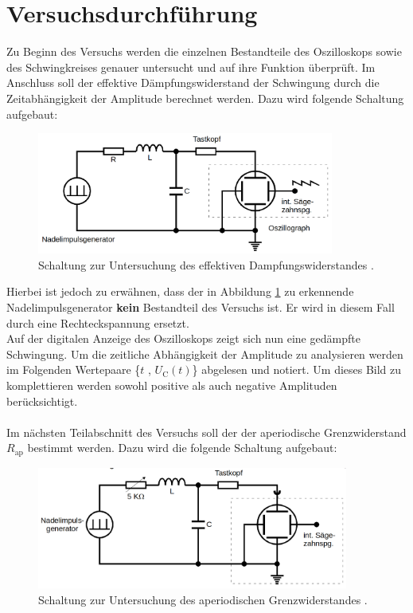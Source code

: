 


\section{Versuchsdurchführung}

Zu Beginn des Versuchs werden die einzelnen Bestandteile des Oszilloskops sowie des Schwingkreises genauer untersucht 
und auf ihre Funktion überprüft. Im Anschluss soll der effektive Dämpfungswiderstand der Schwingung durch die 
Zeitabhängigkeit der Amplitude berechnet werden. Dazu wird folgende Schaltung aufgebaut:

\begin{figure}
    \centering
    \includegraphics[height=4cm]{5a.png}
    \caption{Schaltung zur Untersuchung des effektiven Dampfungswiderstandes \cite{Versuchsanleitung_v354}.}
    \label{fig:5a}
\end{figure}

\noindent Hierbei ist jedoch zu erwähnen, dass der in Abbildung \ref{fig:5a} zu erkennende Nadelimpulsgenerator \textbf{kein}
Bestandteil des Versuchs ist. Er wird in diesem Fall durch eine Rechteckspannung ersetzt.\\
Auf der digitalen Anzeige des Oszilloskops zeigt sich nun eine gedämpfte Schwingung. Um die zeitliche Abhängigkeit der Amplitude 
zu analysieren werden im Folgenden Wertepaare \{$t$ , $U_\text{C}(t)$\} abgelesen und notiert. Um dieses Bild zu komplettieren 
werden sowohl positive als auch negative Amplituden berücksichtigt.\\\\

\noindent Im nächsten Teilabschnitt des Versuchs soll der der aperiodische Grenzwiderstand $R_\text{ap}$ bestimmt werden. Dazu wird 
die folgende Schaltung aufgebaut:

\begin{figure}[H]
    \centering
    \includegraphics[height=4cm]{5b.png}
    \caption{Schaltung zur Untersuchung des aperiodischen Grenzwiderstandes \cite{Versuchsanleitung_v354}.}
    \label{fig:5b}
\end{figure}


